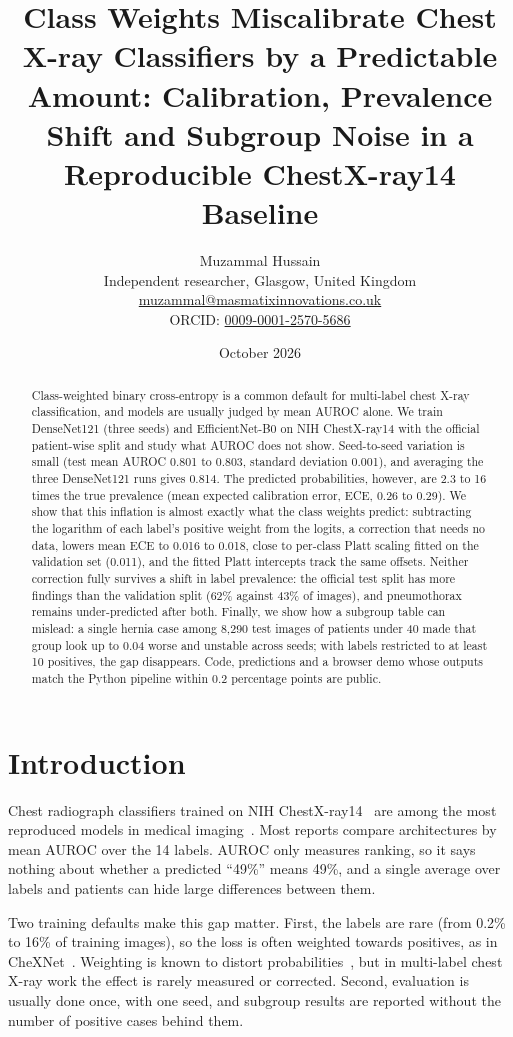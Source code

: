 \documentclass[11pt]{article}
\title{Class Weights Miscalibrate Chest X-ray Classifiers by a Predictable Amount: Calibration, Prevalence Shift and Subgroup Noise in a Reproducible ChestX-ray14 Baseline}
\author{Muzammal Hussain\\
\small Independent researcher, Glasgow, United Kingdom\\
\small \href{mailto:muzammal@masmatixinnovations.co.uk}{muzammal@masmatixinnovations.co.uk}\\
\small ORCID: \href{https://orcid.org/0009-0001-2570-5686}{0009-0001-2570-5686}}
\date{\small October 2026}
\begin{document}
\maketitle

\begin{abstract}
Class-weighted binary cross-entropy is a common default for multi-label chest X-ray classification, and models are usually judged by mean AUROC alone. We train DenseNet121 (three seeds) and EfficientNet-B0 on NIH ChestX-ray14 with the official patient-wise split and study what AUROC does not show. Seed-to-seed variation is small (test mean AUROC 0.801 to 0.803, standard deviation 0.001), and averaging the three DenseNet121 runs gives 0.814. The predicted probabilities, however, are 2.3 to 16 times the true prevalence (mean expected calibration error, ECE, 0.26 to 0.29). We show that this inflation is almost exactly what the class weights predict: subtracting the logarithm of each label's positive weight from the logits, a correction that needs no data, lowers mean ECE to 0.016 to 0.018, close to per-class Platt scaling fitted on the validation set (0.011), and the fitted Platt intercepts track the same offsets. Neither correction fully survives a shift in label prevalence: the official test split has more findings than the validation split (62\% against 43\% of images), and pneumothorax remains under-predicted after both. Finally, we show how a subgroup table can mislead: a single hernia case among 8,290 test images of patients under 40 made that group look up to 0.04 worse and unstable across seeds; with labels restricted to at least 10 positives, the gap disappears. Code, predictions and a browser demo whose outputs match the Python pipeline within 0.2 percentage points are public.
\end{abstract}

\section{Introduction}

Chest radiograph classifiers trained on NIH ChestX-ray14~\cite{wang2017chestxray8} are among the most reproduced models in medical imaging~\cite{rajpurkar2017chexnet}. Most reports compare architectures by mean AUROC over the 14 labels. AUROC only measures ranking, so it says nothing about whether a predicted ``49\%'' means 49\%, and a single average over labels and patients can hide large differences between them.

Two training defaults make this gap matter. First, the labels are rare (from 0.2\% to 16\% of training images), so the loss is often weighted towards positives, as in CheXNet~\cite{rajpurkar2017chexnet}. Weighting is known to distort probabilities~\cite{caplin2022calibrating,menon2021logit}, but in multi-label chest X-ray work the effect is rarely measured or corrected. Second, evaluation is usually done once, with one seed, and subgroup results are reported without the number of positive cases behind them.
\end{document}
